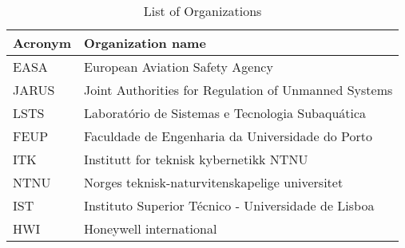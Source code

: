 \begin{table}[H]
    \centering
    \begin{tabularx}{\textwidth}{|l||X|}
    \hline
    Acronym & Organization name \\ \hline\hline
    EASA & European Aviation Safety Agency \\ \hline 
    JARUS&  Joint Authorities for Regulation of Unmanned Systems\\ \hline
    LSTS & Laboratório de Sistemas e Tecnologia Subaquática\\ \hline
    FEUP &Faculdade de Engenharia da Universidade do Porto\\ \hline
    ITK & Institutt for teknisk kybernetikk NTNU\\ \hline
    NTNU& Norges teknisk-naturvitenskapelige universitet\\ \hline
    IST & Instituto Superior Técnico - Universidade de Lisboa\\ \hline
    HWI & Honeywell international\\ \hline
    \end{tabularx} 
    \caption{List of Organizations}
    \label{tab:organizations}
\end{table}

